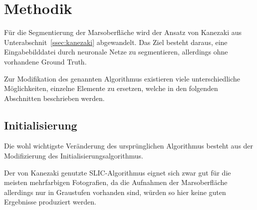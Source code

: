 \chapter{Methodik}
\label{chap:methodik}

Für die Segmentierung der Marsoberfläche wird der Ansatz von Kanezaki \etal \cite{kanezaki_18} aus Unterabschnit~\ref{ssec:kanezaki} abgewandelt. Das Ziel besteht daraus, eine Eingabebilddatei durch neuronale Netze zu segmentieren, allerdings ohne vorhandene Ground Truth.

Zur Modifikation des genannten Algorithmus existieren viele unterschiedliche Möglichkeiten, einzelne Elemente zu ersetzen, welche in den folgenden Abschnitten beschrieben werden.

\section{Initialisierung}
\label{sec:initialization}

Die wohl wichtigste Veränderung des ursprünglichen Algorithmus besteht aus der Modifizierung des Initialisierungsalgorithmus.

Der von Kanezaki \etal genutzte SLIC-Algorithmus eignet sich zwar gut für die meisten mehrfarbigen Fotografien, da die Aufnahmen der Marsoberfläche allerdings nur in Graustufen vorhanden sind, würden so hier keine guten Ergebnisse produziert werden.


